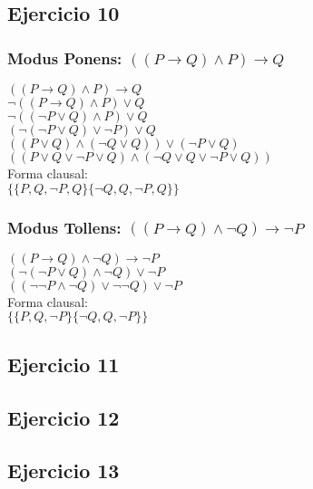 \documentclass[10pt,a4paper]{article}
\begin{document}
  \subsection{Ejercicio 10}
\subsubsection{Modus Ponens: $((P \rightarrow Q) \wedge P) \rightarrow Q$}
$((P \rightarrow Q) \wedge P) \rightarrow Q$ \\
$\neg ((P \rightarrow Q) \wedge P) \vee Q$ \\
$\neg ((\neg P \vee Q) \wedge P) \vee Q$ \\
$(\neg (\neg P \vee Q) \vee \neg P) \vee Q$ \\
$((P \vee Q) \wedge (\neg Q \vee Q )) \vee (\neg P \vee Q)$ \\
$((P \vee Q \vee \neg P \vee Q) \wedge (\neg Q \vee Q \vee \neg P \vee Q))$ \\
Forma clausal: \\
$\{\{P, Q, \neg P, Q\}\{\neg Q, Q, \neg P, Q\}\}$ \\

\subsubsection{Modus Tollens: $((P \rightarrow Q) \wedge \neg Q) \rightarrow \neg P$}
$((P \rightarrow Q) \wedge \neg Q) \rightarrow \neg P$ \\
$(\neg (\neg P \vee Q) \wedge \neg Q) \vee \neg P$ \\
$((\neg \neg P \wedge \neg Q) \vee \neg \neg Q) \vee \neg P$ \\
Forma clausal: \\
$\{\{P, Q, \neg P\}\{\neg Q , Q, \neg P\}\} $ \\

  \subsection{Ejercicio 11}
  \subsection{Ejercicio 12}
  \subsection{Ejercicio 13}
\end{document}
